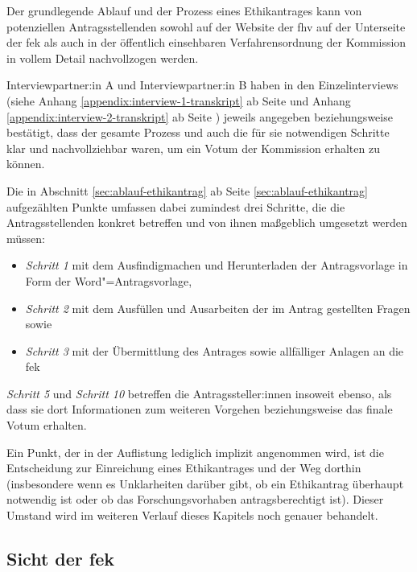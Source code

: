 \documentclass[a4paper,12pt,twoside]{scrreprt}
\begin{document}
Der grundlegende Ablauf und der Prozess eines Ethikantrages kann von potenziellen Antragsstellenden sowohl auf der Website der \ac{fhv} auf der Unterseite der \ac{fek} \cite{fachhochschule_vorarlberg_gmbh_forschungsethik-kommission_2021} als auch in der öffentlich einsehbaren Verfahrensordnung \cite{forschungsethik-kommission_der_fachhochschule_vorarlberg_verfahrensordnung_2020} der Kommission in vollem Detail nachvollzogen werden.

Interviewpartner:in A und Interviewpartner:in B haben in den Einzelinterviews (siehe Anhang \ref{appendix:interview-1-transkript} ab Seite \pageref{appendix:interview-1-transkript} und Anhang \ref{appendix:interview-2-transkript} ab Seite \pageref{appendix:interview-2-transkript}) jeweils angegeben beziehungsweise bestätigt, dass der gesamte Prozess und auch die für sie notwendigen Schritte klar und nachvollziehbar waren, um ein Votum der Kommission erhalten zu können.

\medskip

Die in Abschnitt \ref{sec:ablauf-ethikantrag} ab Seite \ref{sec:ablauf-ethikantrag} aufgezählten Punkte umfassen dabei zumindest drei Schritte, die die Antragsstellenden konkret betreffen und von ihnen maßgeblich umgesetzt werden müssen:
\begin{itemize}
    \item \textit{Schritt 1} mit dem Ausfindigmachen und Herunterladen der Antragsvorlage in Form der Word"=Antragsvorlage,
    \item \textit{Schritt 2} mit dem Ausfüllen und Ausarbeiten der im Antrag gestellten Fragen sowie
    \item \textit{Schritt 3} mit der Übermittlung des Antrages sowie allfälliger Anlagen an die \ac{fek}
\end{itemize}

\noindent\textit{Schritt 5} und \textit{Schritt 10} betreffen die Antragssteller:innen insoweit ebenso, als dass sie dort Informationen zum weiteren Vorgehen beziehungsweise das finale Votum erhalten.

Ein Punkt, der in der Auflistung lediglich implizit angenommen wird, ist die Entscheidung zur Einreichung eines Ethikantrages und der Weg dorthin (insbesondere wenn es Unklarheiten darüber gibt, ob ein Ethikantrag überhaupt notwendig ist oder ob das Forschungsvorhaben antragsberechtigt ist). Dieser Umstand wird im weiteren Verlauf dieses Kapitels noch genauer behandelt.

\subsection{Sicht der \acl{fek}}
\label{sub-sec:sicht-fek}
\end{document}
